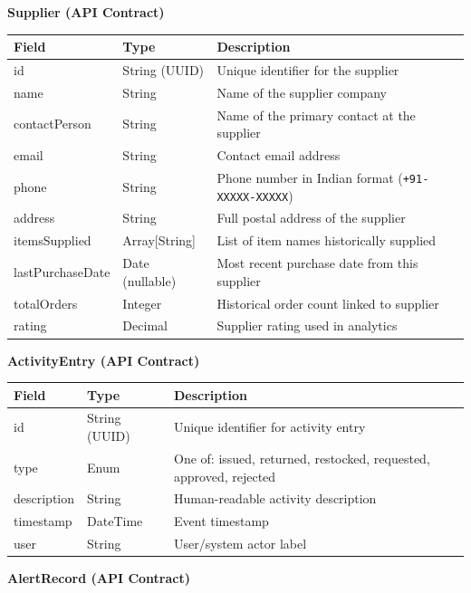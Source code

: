 \documentclass[12pt]{article}
\begin{document}
\textbf{Supplier (API Contract)}

\begin{center}
\begin{tabular}{|l|l|p{7cm}|}
\hline
\textbf{Field} & \textbf{Type} & \textbf{Description} \\
\hline
id & String (UUID) & Unique identifier for the supplier \\
name & String & Name of the supplier company \\
contactPerson & String & Name of the primary contact at the supplier \\
email & String & Contact email address \\
phone & String & Phone number in Indian format (\texttt{+91-XXXXX-XXXXX}) \\
address & String & Full postal address of the supplier \\
itemsSupplied & Array[String] & List of item names historically supplied \\
lastPurchaseDate & Date (nullable) & Most recent purchase date from this supplier \\
totalOrders & Integer & Historical order count linked to supplier \\
rating & Decimal & Supplier rating used in analytics \\
\hline
\end{tabular}
\end{center}

\textbf{ActivityEntry (API Contract)}

\begin{center}
\begin{tabular}{|l|l|p{7cm}|}
\hline
\textbf{Field} & \textbf{Type} & \textbf{Description} \\
\hline
id & String (UUID) & Unique identifier for activity entry \\
type & Enum & One of: issued, returned, restocked, requested, approved, rejected \\
description & String & Human-readable activity description \\
timestamp & DateTime & Event timestamp \\
user & String & User/system actor label \\
\hline
\end{tabular}
\end{center}

\textbf{AlertRecord (API Contract)}
\end{document}
